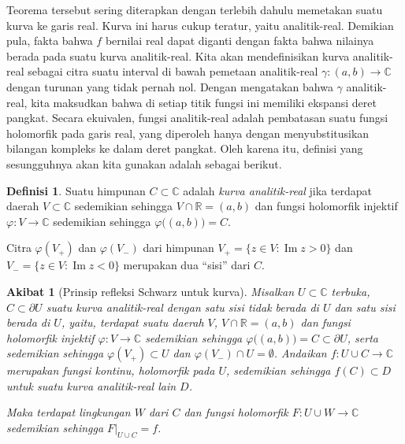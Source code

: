 \documentclass[12pt,openany]{book}
\renewcommand{\Im}{\operatorname{Im}}
\newcommand{\C}{{\mathbb{C}}}
\newcommand{\R}{{\mathbb{R}}}
\newcommand{\myquote}[1]{``#1''}
\theoremstyle{plain}
\newtheorem{cor}[thm]{Akibat}
\theoremstyle{remark}
\theoremstyle{definition}
\newtheorem{defn}[thm]{Definisi}
\theoremstyle{exercise}
\theoremstyle{example}
\begin{document}
Teorema tersebut sering diterapkan dengan terlebih dahulu memetakan suatu kurva ke garis real.
Kurva ini harus cukup teratur, yaitu analitik-real.  Demikian pula, fakta
bahwa $f$ bernilai real dapat diganti dengan fakta bahwa nilainya berada pada suatu
kurva analitik-real.
Kita akan mendefinisikan kurva analitik-real sebagai citra
suatu interval di bawah
pemetaan analitik-real $\gamma \colon (a,b) \to \C$
dengan turunan yang tidak pernah nol.
Dengan mengatakan bahwa $\gamma$ analitik-real, kita maksudkan bahwa di setiap titik fungsi ini memiliki
ekspansi deret pangkat.  Secara ekuivalen, fungsi analitik-real adalah
pembatasan suatu fungsi holomorfik pada garis real, yang diperoleh hanya dengan menyubstitusikan
bilangan kompleks ke dalam deret pangkat.  Oleh karena itu, definisi yang sesungguhnya akan
kita gunakan adalah sebagai berikut.

\begin{defn}
Suatu himpunan $C \subset \C$ adalah \emph{kurva analitik-real}
jika terdapat daerah $V \subset \C$ sedemikian sehingga
$V \cap \R = (a,b)$ dan fungsi holomorfik injektif $\varphi \colon V \to \C$
sedemikian sehingga $\varphi\bigl( (a,b) \bigr) = C$.
\end{defn}

Citra $\varphi(V_+)$ dan $\varphi(V_-)$ dari himpunan
$V_+ = \{ z \in V : \Im z > 0 \}$ dan $V_- = \{ z \in V : \Im z < 0 \}$
merupakan dua \myquote{sisi} dari $C$.

\begin{cor}[Prinsip refleksi Schwarz untuk kurva]
Misalkan $U \subset \C$ terbuka,
$C \subset \partial U$ suatu kurva analitik-real dengan satu sisi
tidak berada di $U$ dan satu sisi berada di $U$, yaitu, terdapat suatu daerah $V$,
$V \cap \R = (a,b)$ dan fungsi holomorfik injektif $\varphi \colon V \to \C$
sedemikian sehingga $\varphi\bigl( (a,b) \bigr) = C \subset \partial U$,
serta sedemikian sehingga $\varphi(V_+) \subset U$ dan $\varphi(V_-) \cap U =
\emptyset$.  Andaikan $f \colon U \cup C \to \C$ merupakan fungsi kontinu,
holomorfik pada $U$, sedemikian sehingga $f(C) \subset D$ untuk suatu
kurva analitik-real lain $D$.

Maka terdapat lingkungan $W$ dari $C$ dan fungsi holomorfik
$F \colon U \cup W \to \C$ sedemikian sehingga $F|_{U \cup C} = f$.
\end{cor}
\end{document}
